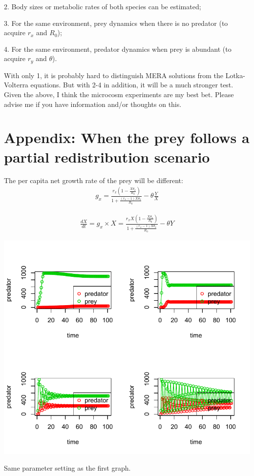 \documentclass[12pt]{article}
\begin{document}
2. Body sizes or metabolic rates of both species can be estimated;

3. For the same environment, prey dynamics when there is no predator (to acquire $r_x$ and $R_0$);

4. For the same environment, predator dynamics when prey is abundant (to acquire $r_y$ and $\theta$).

With only 1, it is probably hard to distinguish MERA solutions from the Lotka-Volterra equations. But with 2-4 in addition, it will be a much stronger test. Given the above, I think the microcosm experiments are my best bet. Please advise me if you have information and/or thoughts on this.

\section{Appendix: When the prey follows a partial redistribution scenario}
The per capita net growth rate of the prey will be different:
 \begin{equation}
 \begin{split}
g_x = \frac{r_{x}  (1 -\frac{X\theta_x}{R_0 })}{ 1 +  \frac{(r_{x}-1)X\theta_x}{R_0}}   -  \theta\frac{Y}{X} 
\end{split}
\end{equation}

 \begin{equation}
 \begin{split}
 \frac{d X}{d t}= g_x \times X = \frac{r_{x} X  (1 -\frac{X\theta_x}{R_0 })}{ 1 +  \frac{(r_{x}-1)X\theta_x}{R_0}}   -  \theta Y
\end{split}
\end{equation}

\includegraphics[width=\textwidth]{predator-prey-dynamics-partial.pdf}

Same parameter setting as the first graph.
\end{document}
